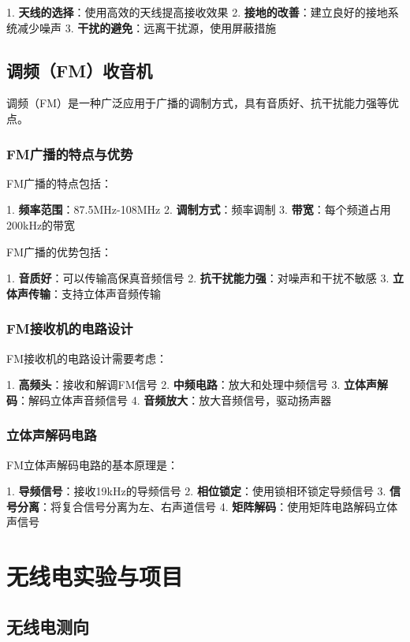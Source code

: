 \documentclass[12pt,UTF8]{ctexbook}
\begin{document}
1. \textbf{天线的选择}：使用高效的天线提高接收效果
2. \textbf{接地的改善}：建立良好的接地系统减少噪声
3. \textbf{干扰的避免}：远离干扰源，使用屏蔽措施

\chapter{调频（FM）收音机}

调频（FM）是一种广泛应用于广播的调制方式，具有音质好、抗干扰能力强等优点。

\section{FM广播的特点与优势}

FM广播的特点包括：

1. \textbf{频率范围}：87.5MHz-108MHz
2. \textbf{调制方式}：频率调制
3. \textbf{带宽}：每个频道占用200kHz的带宽

FM广播的优势包括：

1. \textbf{音质好}：可以传输高保真音频信号
2. \textbf{抗干扰能力强}：对噪声和干扰不敏感
3. \textbf{立体声传输}：支持立体声音频传输

\section{FM接收机的电路设计}

FM接收机的电路设计需要考虑：

1. \textbf{高频头}：接收和解调FM信号
2. \textbf{中频电路}：放大和处理中频信号
3. \textbf{立体声解码}：解码立体声音频信号
4. \textbf{音频放大}：放大音频信号，驱动扬声器

\section{立体声解码电路}

FM立体声解码电路的基本原理是：

1. \textbf{导频信号}：接收19kHz的导频信号
2. \textbf{相位锁定}：使用锁相环锁定导频信号
3. \textbf{信号分离}：将复合信号分离为左、右声道信号
4. \textbf{矩阵解码}：使用矩阵电路解码立体声信号

\part{无线电实验与项目}

\chapter{无线电测向}
\end{document}
